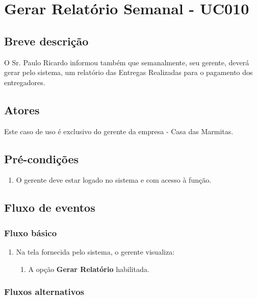 \chapter{Gerar Relatório Semanal - UC010} \label{uc010}

\section{Breve descrição}

O Sr. Paulo Ricardo informou também que semanalmente, seu gerente, deverá gerar pelo sistema, um relatório das Entregas Realizadas para o pagamento dos entregadores.

\section{Atores}

Este caso de uso é exclusivo do gerente da empresa - Casa das Marmitas.

\section{Pré-condições}

\begin{enumerate}
	\item O gerente deve estar logado no sistema e com acesso à função.
\end{enumerate}

\section{Fluxo de eventos}

\subsection{Fluxo básico}

\begin{enumerate}
	\item Na tela fornecida pelo sistema, o gerente visualiza:
	\begin{enumerate}
		\item A opção \textbf{Gerar Relatório} habilitada.
	\end{enumerate}		
\end{enumerate}

\subsection{Fluxos alternativos}

